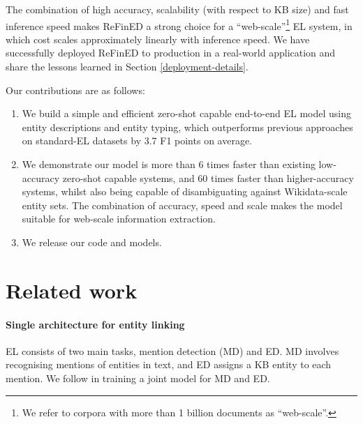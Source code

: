 \documentclass[11pt]{article}
\begin{document}
The combination of high accuracy, scalability (with respect to KB size) and fast inference speed makes ReFinED a strong choice for a ``web-scale''\footnote{We refer to corpora with more than 1 billion documents as ``web-scale''.} EL system, in which cost scales approximately linearly with inference speed. We have successfully deployed ReFinED to production in a real-world application and share the lessons learned in Section \ref{deployment-details}.





















Our contributions are as follows:
\vspace{-2mm}
\begin{enumerate}
	\item{We build a simple and efficient zero-shot capable end-to-end EL model using entity descriptions and entity typing, which outperforms previous approaches on standard-EL datasets by 3.7 F1 points on average.}
	\vspace{-2mm}
	\item{We demonstrate our model is more than 6 times faster than existing low-accuracy zero-shot capable systems, and 60 times faster than higher-accuracy systems, whilst also being capable of disambiguating against Wikidata-scale entity sets. The combination of accuracy, speed and scale makes the model suitable for web-scale information extraction.} 
	\vspace{-2mm}
	\item{We release our code and models.}
\end{enumerate}


\section{Related work}

\paragraph{Single architecture for entity linking}
EL consists of two main tasks, mention detection (MD) and ED. MD involves recognising mentions of entities in text, and ED assigns a KB entity to each mention. We follow \citep{kolitsas-etal-2018-end} in training a joint model for MD and ED. 
\end{document}
